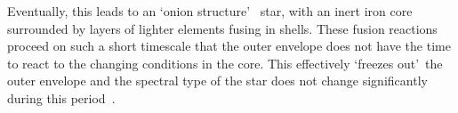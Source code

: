 Eventually, this leads to an \textquoteleft onion structure\textquoteright
~star, with an inert iron core surrounded by layers of lighter elements fusing in shells.
These fusion reactions proceed on such a short timescale that the outer envelope does not have the time to react to the changing conditions in the core.
This effectively \textquoteleft freezes out\textquoteright ~the outer envelope and the spectral type of the star does not change significantly during this period~\citep{Meynet11}.











